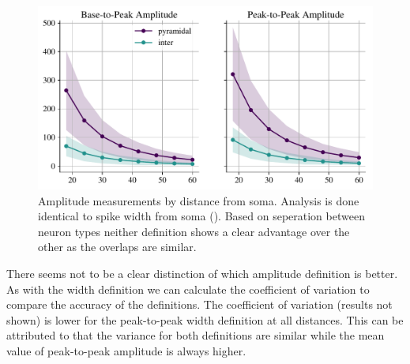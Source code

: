 \documentclass[altfont, fleqn]{uiophd}
\renewcommand{\cref}[1]{{\color{viridis_03}\mycref{#1}}}
\begin{document}
\begin{figure}[h]
    \begin{center}
        \includegraphics[width=\textwidth]{images/sec_4/int_pyr_amps_dist.pdf}
        \caption{
            Amplitude measurements by distance from soma. 
            Analysis is done identical to spike width from soma (\cref{fig:4_width}). 
            Based on seperation between neuron types
            neither definition shows a clear advantage over the other
            as the overlaps are similar. 
        }
        \label{fig:4_amp_distance}
    \end{center}
\end{figure}

There seems not to be a clear distinction of which amplitude definition is better. 
As with the width definition we can calculate the coefficient of variation 
to compare the accuracy of the definitions. 
The coefficient of variation (results not shown) 
is lower for the peak-to-peak width definition at all distances.  
This can be attributed to that the variance for both definitions are similar 
while the mean value of peak-to-peak amplitude is always higher. 

\newpage
\end{document}
